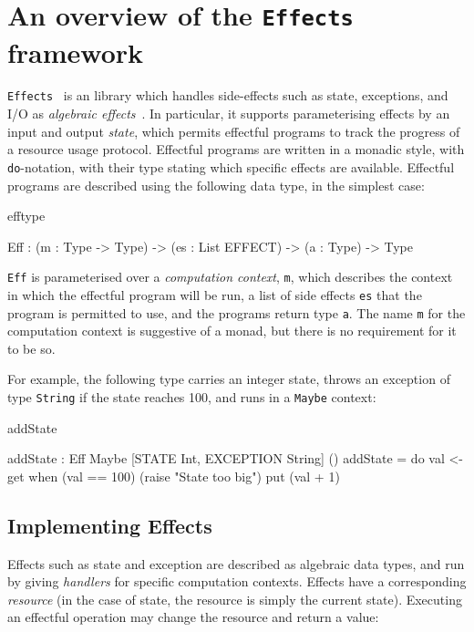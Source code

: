 \section{An overview of the \texttt{Effects} framework}
\label{effects}

\texttt{Effects}~\cite{brady:effects} is an \idris{} library which handles
side-effects such as state, exceptions, and I/O as \emph{algebraic
effects}~\cite{Plotkin2009}. In particular, it supports parameterising effects
by an input and output \emph{state}, which permits effectful programs to track
the progress of a resource usage protocol. Effectful programs are written
in a monadic style, with \texttt{do}-notation, with their type stating which
specific effects are available.
Effectful
programs are described using the following data type,
in the simplest case:

\begin{SaveVerbatim}{efftype}

Eff : (m : Type -> Type) ->
      (es : List EFFECT) -> (a : Type) -> Type

\end{SaveVerbatim}

\noindent
\texttt{Eff} is parameterised over a \emph{computation context}, \texttt{m}, 
which describes the context in which the effectful program will be run, a
list of side effects \texttt{es} that the program is permitted to use, and the
programs return type \texttt{a}. The name \texttt{m} for the computation context is
suggestive of a monad, but there is no requirement for it to be so.

For example, the following type carries an integer state,
throws an exception of type \texttt{String} if the state reaches 100, 
and runs in a \texttt{Maybe} context:

\begin{SaveVerbatim}{addState}

addState : Eff Maybe [STATE Int, EXCEPTION String] ()
addState = do val <- get
              when (val == 100) (raise "State too big")
              put (val + 1)

\end{SaveVerbatim}

\subsection{Implementing Effects}

Effects such as state and exception are described as algebraic data types,
and run by giving \emph{handlers} for specific computation contexts. 
Effects have a corresponding \emph{resource} (in the case of state, the
resource is simply the current state). Executing an effectful operation may
change the resource and return a value:

